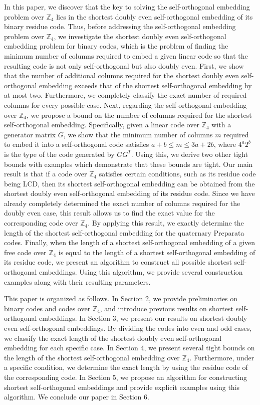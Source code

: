 \documentclass{article}
\theoremstyle{definition}
\theoremstyle{remark}
\begin{document}
In this paper, we discover that the key to solving the self-orthogonal embedding problem over $\mathbb{Z}_4$ lies in the shortest doubly even self-orthogonal embedding of its binary residue code. Thus, before addressing the self-orthogonal embedding problem over $\mathbb{Z}_4$, we investigate the shortest doubly even self-orthogonal embedding problem for binary codes, which is the problem of finding the minimum number of columns required to embed a given linear code so that the resulting code is not only self-orthogonal but also doubly even. First, we show that the number of additional columns required for the shortest doubly even self-orthogonal embedding exceeds that of the shortest self-orthogonal embedding by at most two. Furthermore, we completely classify the exact number of required columns for every possible case. Next, regarding the self-orthogonal embedding over $\mathbb{Z}_4$, we propose a bound on the number of columns required for the shortest self-orthogonal embedding. Specifically, given a linear code over $\mathbb{Z}_4$ with a generator matrix $G$, we show that the minimum number of columns $m$ required to embed it into a self-orthogonal code satisfies $a+b\le m\le 3a+2b$, where $4^a2^b$ is the type of the code generated by $GG^T$. Using this, we derive two other tight bounds with examples which demonstrate that these bounds are tight. Our main result is that if a code over $\mathbb{Z}_4$ satisfies certain conditions, such as its residue code being LCD, then its shortest self-orthogonal embedding can be obtained from the shortest doubly even self-orthogonal embedding of its residue code. Since we have already completely determined the exact number of columns required for the doubly even case, this result allows us to find the exact value for the corresponding code over $\mathbb{Z}_4$. By applying this result, we exactly determine the length of the shortest self-orthogonal embedding for the quaternary Preparata codes. Finally, when the length of a shortest self-orthogonal embedding of a given free code over $\mathbb{Z}_4$ is equal to the length of a shortest self-orthogonal embedding of its residue code, we present an algorithm to construct all possible shortest self-orthogonal embeddings. Using this algorithm, we provide several construction examples along with their resulting parameters.

This paper is organized as follows. In Section 2, we provide preliminaries on binary codes and codes over $\mathbb{Z}_4$, and introduce previous results on shortest self-orthogonal embeddings. In Section 3, we present our results on shortest doubly even self-orthogonal embeddings. By dividing the codes into even and odd cases, we classify the exact length of the shortest doubly even self-orthogonal embedding for each specific case. In Section 4, we present several tight bounds on the length of the shortest self-orthogonal embedding over $\mathbb{Z}_4$. Furthermore, under a specific condition, we determine the exact length by using the residue code of the corresponding code. In Section 5, we propose an algorithm for constructing shortest self-orthogonal embeddings and provide explicit examples using this algorithm. We conclude our paper in Section 6.
\end{document}
